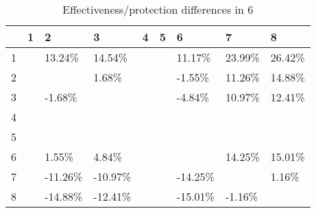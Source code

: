 \begin{table}[ht]
\centering
\begin{tabular}{rllllllll}
  \hline
 & 1 & 2 & 3 & 4 & 5 & 6 & 7 & 8 \\ 
  \hline
1 &  & 13.24\% & 14.54\% &  &  & 11.17\% & 23.99\% & 26.42\% \\ 
  2 &  &  & 1.68\% &  &  & -1.55\% & 11.26\% & 14.88\% \\ 
  3 &  & -1.68\% &  &  &  & -4.84\% & 10.97\% & 12.41\% \\ 
  4 &  &  &  &  &  &  &  &  \\ 
  5 &  &  &  &  &  &  &  &  \\ 
  6 &  & 1.55\% & 4.84\% &  &  &  & 14.25\% & 15.01\% \\ 
  7 &  & -11.26\% & -10.97\% &  &  & -14.25\% &  & 1.16\% \\ 
  8 &  & -14.88\% & -12.41\% &  &  & -15.01\% & -1.16\% &  \\ 
   \hline
\end{tabular}
\caption{Effectiveness/protection differences in  6} 
\end{table}
